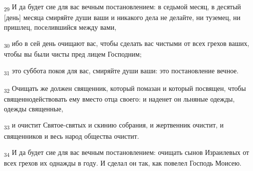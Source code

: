 \begin{tcolorbox}
\textsubscript{29} И да будет сие для вас вечным постановлением: в седьмой месяц, в десятый [день] месяца смиряйте души ваши и никакого дела не делайте, ни туземец, ни пришлец, поселившийся между вами,
\end{tcolorbox}
\begin{tcolorbox}
\textsubscript{30} ибо в сей день очищают вас, чтобы сделать вас чистыми от всех грехов ваших, чтобы вы были чисты пред лицем Господним;
\end{tcolorbox}
\begin{tcolorbox}
\textsubscript{31} это суббота покоя для вас, смиряйте души ваши: это постановление вечное.
\end{tcolorbox}
\begin{tcolorbox}
\textsubscript{32} Очищать же должен священник, который помазан и который посвящен, чтобы священнодействовать ему вместо отца своего: и наденет он льняные одежды, одежды священные,
\end{tcolorbox}
\begin{tcolorbox}
\textsubscript{33} и очистит Святое-святых и скинию собрания, и жертвенник очистит, и священников и весь народ общества очистит.
\end{tcolorbox}
\begin{tcolorbox}
\textsubscript{34} И да будет сие для вас вечным постановлением: очищать сынов Израилевых от всех грехов их однажды в году. И сделал он так, как повелел Господь Моисею.
\end{tcolorbox}
